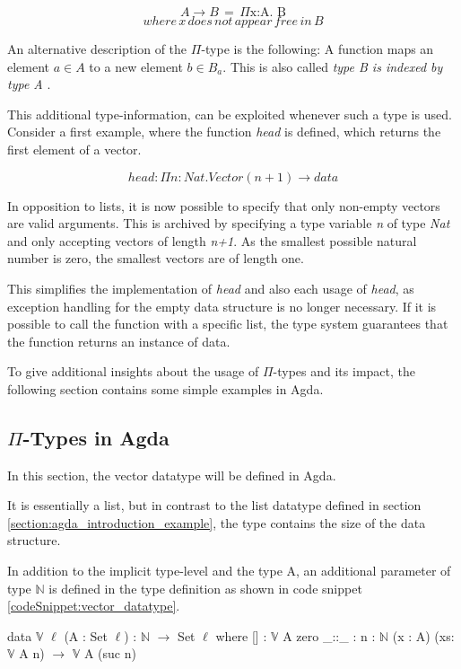 $$A \rightarrow B \, = \, \Pi \text{x:A. B}$$
$$where \, x \, does \, not \, appear \, free \, in \, B$$

An alternative description of the $\Pi$-type is the following: A function maps an element $a \in A$ to a new element $b \in B_a$. 
This is also called \emph{type B is indexed by type A} \cite{10.1145/2841316}.

This additional type-information, can be exploited whenever such a type is used. 
Consider a first example, where the function \emph{head} is defined, which returns the first element of a vector.

$$head : \Pi n : Nat.Vector(n+1) \rightarrow data$$

In opposition to lists, it is now possible to specify that only non-empty vectors are valid arguments. 
This is archived by specifying a type variable \emph{n} of type \emph{Nat} and only accepting vectors of length \emph{n+1}.
As the smallest possible natural number is zero, the smallest vectors are of length one.

This simplifies the implementation of \emph{head} and also each usage of \emph{head}, as exception handling for the empty data structure is no longer necessary. 
If it is possible to call the function with a specific list, the type system guarantees that the function returns an instance of data.

To give additional insights about the usage of $\Pi$-types and its impact, the following section contains some simple examples in Agda.

\subsection{$\Pi$-Types in Agda}\label{section_dependent_types_example}
In this section, the vector datatype will be defined in Agda.

It is essentially a list, but in contrast to the list datatype defined in section \ref{section:agda_introduction_example}, the type contains the size of the data structure.

In addition to the implicit type-level and the type A, an additional parameter of type $\mathbb{N}$ is defined in the type definition as shown in code snippet \ref{codeSnippet:vector_datatype}.

\begin{codesnippet}[mathescape=true, caption={Definition of the vector datatype in Agda}, label={codeSnippet:vector_datatype}]
data $\mathbb{V}$ {$\ell$} (A : Set $\ell$) : $\mathbb{N}$ $\rightarrow$ Set $\ell$ where
  [] : $\mathbb{V}$ A zero
  _::_ : {n : $\mathbb{N}$} (x : A) (xs: $\mathbb{V}$ A n) $\rightarrow$
         $\mathbb{V}$ A (suc n)
\end{codesnippet}

